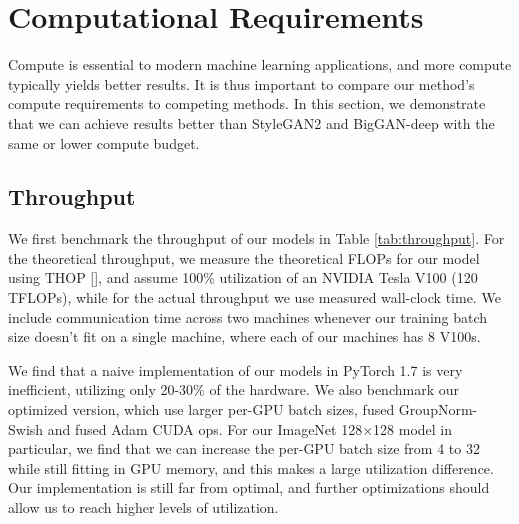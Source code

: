 \documentclass{article}
\newcommand{\shortcite}[1]{[\citenum{#1}]}
\begin{document}
\newpage
\appendix
\section{Computational Requirements}
\label{app:compute}

Compute is essential to modern machine learning applications, and more compute typically yields better results. It is thus important to compare our method's compute requirements to competing methods. In this section, we demonstrate that we can achieve results better than StyleGAN2 and BigGAN-deep with the same or lower compute budget.

\subsection{Throughput}
We first benchmark the throughput of our models in Table \ref{tab:throughput}. For the theoretical throughput, we measure the theoretical FLOPs for our model using THOP \shortcite{thoprepo}, and assume 100\% utilization of an NVIDIA Tesla V100 (120 TFLOPs), while for the actual throughput we use measured wall-clock time. We include communication time across two machines whenever our training batch size doesn't fit on a single machine, where each of our machines has 8 V100s.

We find that a naive implementation of our models in PyTorch 1.7 is very inefficient, utilizing only 20-30\% of the hardware. We also benchmark our optimized version, which use larger per-GPU batch sizes, fused GroupNorm-Swish and fused Adam CUDA ops. For our ImageNet 128$\times$128 model in particular, we find that we can increase the per-GPU batch size from 4 to 32 while still fitting in GPU memory, and this makes a large utilization difference. Our implementation is still far from optimal, and further optimizations should allow us to reach higher levels of utilization.
\end{document}
